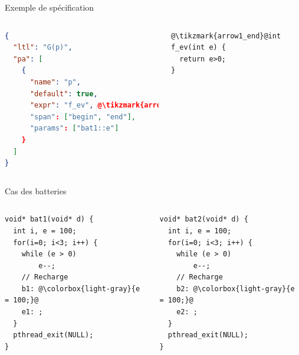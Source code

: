 \documentclass{beamer}
\newcommand{\tikzmark}[2][]{%
  \tikz[remember picture,overlay,baseline=-.5ex] \node[#1] (#2) {};%
}
\begin{document}
\begin{frame}[fragile]{Exemple de spécification}

  \begin{columns}[onlytextwidth, c]

  \begin{lstlisting}[language=json]
{
  "ltl": "G(p)",
  "pa": [
    {
      "name": "p",
      "default": true,
      "expr": "f_ev", @\tikzmark{arrow1_begin}@
      "span": ["begin", "end"],
      "params": ["bat1::e"]
    }
  ]
}
\end{lstlisting}

\begin{lstlisting}[frame=l]
@\tikzmark{arrow1_end}@int f_ev(int e) {
  return e>0;
}
\end{lstlisting}

  \end{columns}

\end{frame}


\begin{frame}[fragile]{Cas des batteries}
\begin{columns}[onlytextwidth, T]
\begin{lstlisting}[caption=Thread 1, frame=single]
void* bat1(void* d) {
  int i, e = 100;
  for(i=0; i<3; i++) {
    while (e > 0)
        e--;
    // Recharge
    b1: @\colorbox{light-gray}{e = 100;}@
    e1: ;
  }
  pthread_exit(NULL);
}
\end{lstlisting}

\begin{lstlisting}[frame=single, caption=Thread 2]
void* bat2(void* d) {
  int i, e = 100;
  for(i=0; i<3; i++) {
    while (e > 0)
        e--;
    // Recharge
    b2: @\colorbox{light-gray}{e = 100;}@
    e2: ;
  }
  pthread_exit(NULL);
}
\end{lstlisting}
\end{columns}
\end{frame}
\end{document}
